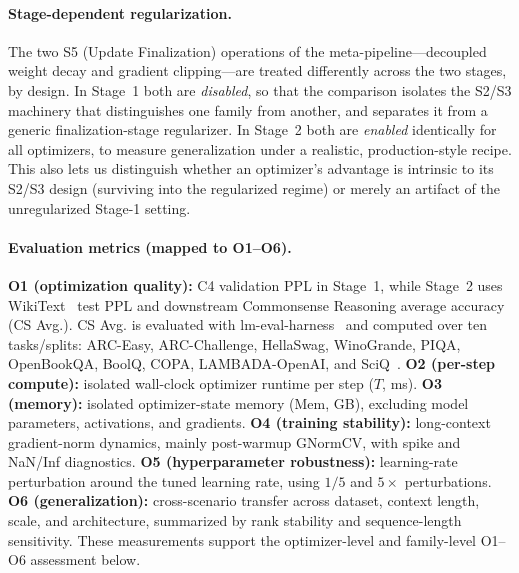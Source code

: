 \paragraph{Stage-dependent regularization.}
The two S5 (Update Finalization) operations of the meta-pipeline---decoupled
weight decay and gradient clipping---are treated differently across the two
stages, by design. In Stage~1 both are \emph{disabled}, so that the comparison
isolates the S2/S3 machinery that distinguishes one family from another, and
separates it from a generic finalization-stage regularizer. In Stage~2
both are \emph{enabled} identically for all optimizers, to measure
generalization under a realistic, production-style recipe. This also lets us
distinguish whether an optimizer's advantage is intrinsic to its S2/S3 design
(surviving into the regularized regime) or merely an artifact of the
unregularized Stage-1 setting.
 



\paragraph{Evaluation metrics (mapped to O1--O6).}
\textbf{O1 (optimization quality):} C4 validation PPL in Stage~1, while
Stage~2 uses WikiText~\cite{merity2016pointer} test PPL and downstream Commonsense Reasoning average
accuracy (CS Avg.). CS Avg. is evaluated with lm-eval-harness~\cite{eval-harness} and
computed over ten tasks/splits: ARC-Easy, ARC-Challenge, HellaSwag,
WinoGrande, PIQA, OpenBookQA, BoolQ, COPA, LAMBADA-OpenAI, and
SciQ~\cite{clark2018think,zellers2019hellaswag,sakaguchi2021winogrande,bisk2020piqa,mihaylov2018can,clark2019boolq,roemmele2011choice,paperno-EtAl:2016:P16-1,welbl2017crowdsourcing}. \textbf{O2 (per-step compute):} isolated wall-clock
optimizer runtime per step ($T$, ms). \textbf{O3 (memory):} isolated
optimizer-state memory (Mem, GB), excluding model parameters, activations, and
gradients. \textbf{O4 (training stability):} long-context gradient-norm
dynamics, mainly post-warmup GNormCV, with spike and NaN/Inf diagnostics.
\textbf{O5 (hyperparameter robustness):} learning-rate perturbation around the
tuned learning rate, using $1/5$ and $5\times$ perturbations. \textbf{O6
(generalization):} cross-scenario transfer across dataset, context length,
scale, and architecture, summarized by rank stability and sequence-length
sensitivity. These measurements support the optimizer-level and family-level
O1--O6 assessment below.